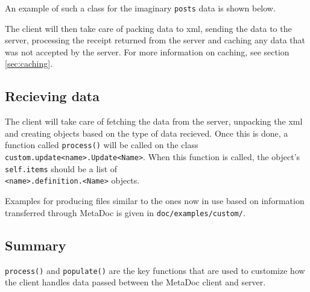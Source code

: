 An example of such a class for the imaginary \texttt{posts} data is shown
below.


The client will then take care of packing data to \gls{xml}, sending the data
to the server, processing the receipt returned from the server and caching any
data that was not accepted by the server. For more information on caching, see
section \ref{sec:caching}.

\subsection{Recieving data}
\label{sec:customizing_client_recieve}
The client will take care of fetching the data from the server, unpacking the
\gls{xml} and creating objects based on the type of data recieved. Once this is
done, a function called \texttt{process()} will be called on the class
\texttt{custom.update<name>.Update<Name>}. When this function is called, the
object's \texttt{self.items} should be a list of \\
\texttt{<name>.definition.<Name>} objects.

Examples for producing files similar to the ones now in use based on
information transferred through MetaDoc is given in
\texttt{doc/examples/custom/}.

\subsection{Summary}
\texttt{process()} and \texttt{populate()} are the key functions that are used
to customize how the client handles data passed between the MetaDoc client and
server. 
